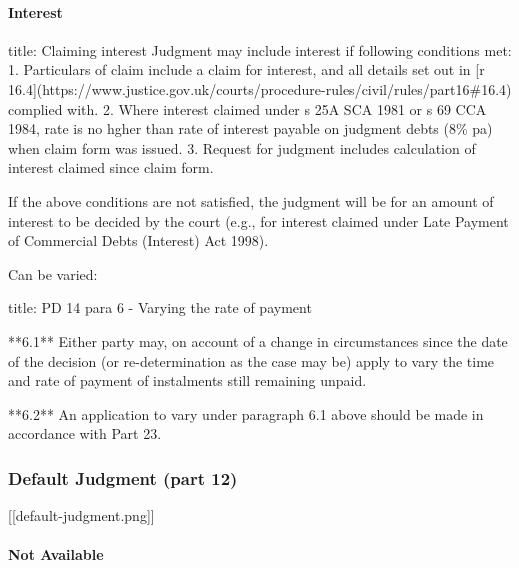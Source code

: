 \documentclass[
]{article}
\newenvironment{Shaded}{}{}
\newcommand{\NormalTok}[1]{#1}
\begin{document}
\hypertarget{interest}{%
\paragraph{Interest}\label{interest}}

\begin{Shaded}
\begin{Highlighting}[]
\NormalTok{title: Claiming interest}
\NormalTok{Judgment may include interest if following conditions met:}
\NormalTok{1. Particulars of claim include a claim for interest, and all details set out in [r 16.4](https://www.justice.gov.uk/courts/procedure{-}rules/civil/rules/part16\#16.4) complied with.}
\NormalTok{2. Where interest claimed under s 25A SCA 1981 or s 69 CCA 1984, rate is no hgher than rate of interest payable on judgment debts (8\% pa) when claim form was issued.}
\NormalTok{3. Request for judgment includes calculation of interest claimed since claim form.}
\end{Highlighting}
\end{Shaded}

If the above conditions are not satisfied, the judgment will be for an
amount of interest to be decided by the court (e.g., for interest
claimed under Late Payment of Commercial Debts (Interest) Act 1998).

Can be varied:

\begin{Shaded}
\begin{Highlighting}[]
\NormalTok{title: PD 14 para 6 {-} Varying the rate of payment}

\NormalTok{**6.1** Either party may, on account of a change in circumstances since the date of the decision (or re{-}determination as the case may be) apply to vary the time and rate of payment of instalments still remaining unpaid.}

\NormalTok{**6.2** An application to vary under paragraph 6.1 above should be made in accordance with Part 23.}
\end{Highlighting}
\end{Shaded}

\hypertarget{default-judgment-part-12}{%
\subsubsection{Default Judgment (part
12)}\label{default-judgment-part-12}}

{[}{[}default-judgment.png{]}{]}

\hypertarget{not-available}{%
\paragraph{Not Available}\label{not-available}}
\end{document}
